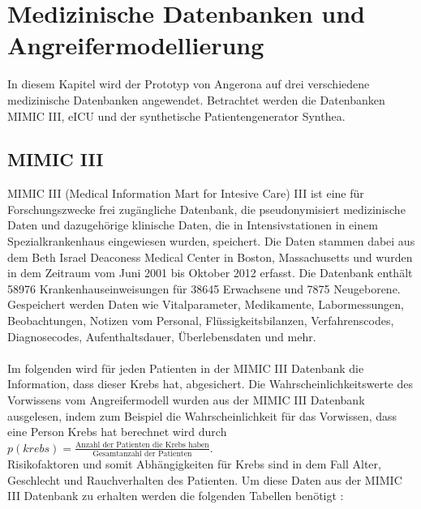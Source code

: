 \documentclass[german,version-2020-11]{uzl-thesis}
\begin{document}
\chapter{Medizinische Datenbanken und Angreifermodellierung}\label{chap:Modellierung}
In diesem Kapitel wird der Prototyp von Angerona auf drei verschiedene medizinische Datenbanken angewendet. Betrachtet werden die Datenbanken MIMIC III, eICU und der synthetische Patientengenerator Synthea.
\section{MIMIC III}
MIMIC III (Medical Information Mart for Intesive Care) III \cite{12} ist eine für Forschungszwecke frei zugängliche Datenbank, die pseudonymisiert medizinische Daten und dazugehörige klinische Daten, die in Intensivstationen in einem Spezialkrankenhaus eingewiesen wurden, speichert. Die Daten stammen dabei aus dem Beth Israel Deaconess Medical Center in Boston, Massachusetts und wurden in dem Zeitraum vom Juni 2001 bis Oktober 2012 erfasst. Die Datenbank enthält 58976 Krankenhauseinweisungen für 38645 Erwachsene und 7875 Neugeborene. Gespeichert werden Daten wie Vitalparameter, Medikamente, Labormessungen, Beobachtungen, Notizen vom Personal, Flüssigkeitsbilanzen, Verfahrenscodes, Diagnosecodes, Aufenthaltsdauer, Überlebensdaten und mehr.  \\ \\ 
Im folgenden wird für jeden Patienten in der MIMIC III Datenbank die Information, dass dieser Krebs hat, abgesichert. Die Wahrscheinlichkeitswerte des Vorwissens vom Angreifermodell wurden aus der MIMIC III Datenbank ausgelesen, indem zum Beispiel die Wahrscheinlichkeit für das Vorwissen, dass eine Person Krebs hat berechnet wird durch $
p(krebs) =  \frac{\text{Anzahl der Patienten die Krebs haben}}{\text{Gesamtanzahl der Patienten}}$. \\ 
Risikofaktoren und somit Abhängigkeiten für Krebs sind in dem Fall Alter, Geschlecht und Rauchverhalten des Patienten\cite{13,14}. Um diese Daten aus der MIMIC III Datenbank zu erhalten werden die folgenden Tabellen benötigt : 
\end{document}
